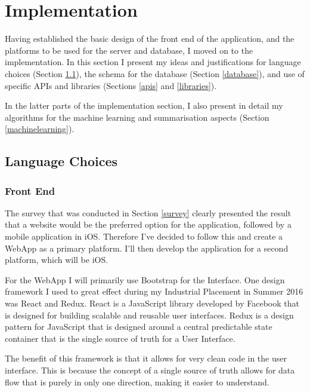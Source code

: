 \documentclass[12pt]{article}
\begin{document}

\newpage

\section{Implementation}

Having established the basic design of the front end of the application, and the platforms to be used for the server and database, I moved on to the implementation. In this section I present my ideas and justifications for language choices (Section \ref{languagechoice}), the schema for the database (Section \ref{database}), and use of specific APIs and libraries (Sections \ref{apis} and \ref{libraries}).

In the latter parts of the implementation section, I also present in detail my algorithms for the machine learning and summarisation aspects (Section \ref{machinelearning}).  

\subsection{Language Choices}

\label{languagechoice}

\subsubsection{Front End}

The survey that was conducted in Section \ref{survey} clearly presented the result that a website would be the preferred option for the application, followed by a mobile application in iOS. Therefore I've decided to follow this and create a WebApp as a primary platform. I'll then develop the application for a second platform, which will be iOS.

For the WebApp I will primarily use Bootstrap for the Interface. One design framework I used to great effect during my Industrial Placement in Summer 2016 was React and Redux. React is a JavaScript library developed by Facebook that is designed for building scalable and reusable user interfaces. Redux is a design pattern for JavaScript that is designed around a central predictable state container that is the single source of truth for a User Interface. 

The benefit of this framework is that it allows for very clean code in the user interface. This is because the concept of a single source of truth allows for data flow that is purely in only one direction, making it easier to understand.
\end{document}
